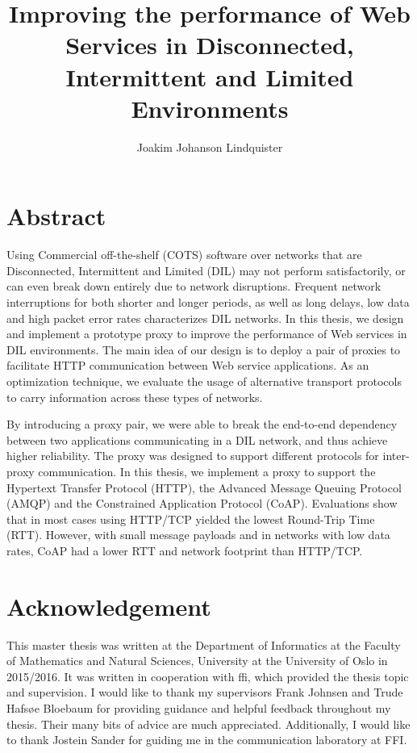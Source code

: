 \documentclass[USenglish]{ifimaster}
\title{Improving the performance of Web Services in Disconnected, Intermittent
and Limited Environments}
\author{Joakim Johanson Lindquister}
\begin{document}
\ififorside{}

\chapter*{Abstract}

Using Commercial off-the-shelf (COTS) software over networks that are
Disconnected, Intermittent and Limited (DIL) may not perform satisfactorily, or
can even break down entirely due to network disruptions. Frequent network
interruptions for both shorter and longer periods, as well as long delays, low
data and high packet error rates characterizes DIL networks. In this thesis, we
design and implement a prototype proxy to improve the performance of Web
services in DIL environments. The main idea of our design is to deploy a pair of
proxies to facilitate HTTP communication between Web service applications. As an
optimization technique, we evaluate the usage of alternative transport protocols
to carry information across these types of networks.

By introducing a proxy pair, we were able to break the end-to-end dependency
between two applications communicating in a DIL network, and thus achieve higher
reliability. The proxy was designed to support different protocols for
inter-proxy communication. In this thesis, we implement a proxy to support the
Hypertext Transfer Protocol (HTTP), the Advanced Message Queuing Protocol (AMQP)
and the Constrained Application Protocol (CoAP). Evaluations show that in most
cases using HTTP/TCP yielded the lowest Round-Trip Time (RTT). However, with
small message payloads and in networks with low data rates, CoAP had a lower RTT
and network footprint than HTTP/TCP.



\chapter*{Acknowledgement}

This master thesis was written at the Department of Informatics at the Faculty
of Mathematics and Natural Sciences, University at the University of Oslo in
2015/2016. It was written in cooperation with \gls{ffi}, which provided the
thesis topic and supervision. I would like to thank my supervisors Frank Johnsen
and Trude Hafsøe Bloebaum for providing guidance and helpful feedback throughout
my thesis. Their many bits of advice are much appreciated. Additionally, I would
like to thank Jostein Sander for guiding me in the communication laboratory at
FFI.
\end{document}
